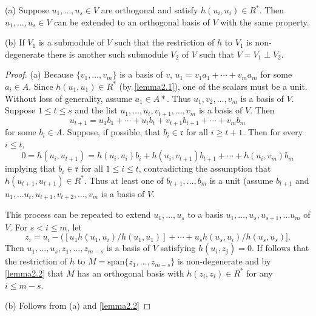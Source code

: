 \begin{lemma}\label{lemma2.3}
\begin{description}
\item{(a)} Suppose $u_1, \dotsc, u_s \in V$ are orthogonal and satisfy $h(u_i, u_i) \in R^*$.
Then $u_1, \dotsc , u_s \in V$ can be extended to an orthogonal basis of $V$ with the same property.
\item{(b)} If $V_1$ is a submodule of $V$ such that the restriction of $h$ to $V_1$ is non-degenerate there is another such submodule $V_2$ of $V$ such that $V = V_1 \perp V_2$.
\end{description}
\end{lemma}
\begin{proof}
(a) Because $\{v_1, \dotsc, v_m \}$ is a basis of $v$, $u_1 = v_1 a_1 + \dotsb + v_m a_m$ for some $a_i \in A$.
Since $h(u_1, u_1) \in R^*$ (by \cref{lemma2.1}), one of the scalars must be a unit. Without loss of generality, assume $a_1 \in A*$.
Thus $u_1, v_2, \dotsc, v_m$ is a basis of $V$.
Suppose $1 \le t \le s$ and the list $u_1, \dotsc, u_t, v_{t+1}, \dotsc, v_m$ is a basis of $V$.
Then 
\[
u_{t+1} = u_1b_1 + \dotsb + u_t b_t + v_{t+1} b_{t+1} + \dotsb + v_m b_m
\]
for some $b_i \in A$.
Suppose, if possible, that $b_i \in \mathfrak{r}$ for all $i \ge t+1$.
Then for every $i \le t$,
\[
0 = h(u_i, u_{t+1}) = h(u_i, u_i) b_i + h(u_i, v_{t+1})b_{t+1} + \dotsb + h(u_i, v_m) b_m
\]
implying that $b_i \in \mathfrak{r}$ for all $1 \le i \le t$, contradicting the assumption that $h(u_{t+1}, u_{t+1}) \in R^*$.
Thus at least one of $b_{t+1}, \dotsc,b_m$ is a unit (assume $b_{t+1}$ and $u_1, \dotsc u_t, u_{t+1}, v_{t+2}, \dotsc, v_m$ is a basis of $V$.

This process can be repeated to extend $u_1, \dotsc, u_s$ to a basis $u_1, \dotsc, u_s, u_{s+1}, \dotsc u_m$ of $V$.
For $s < i \le m$, let
\[
z_i = u_i - ([u_1h(u_1, u_i)/h(u_1, u_1)] + \dotsb + u_s h(u_s, u_i) / h(u_s, u_s)].
\]
Then $u_1, \dotsc, u_s, z_1, \dotsc, z_{m-s}$ is a basis of $V$ satisfying $h(u_i, z_j) = 0$.
If follows that the restriction of $h$ to $M = \text{span} \{z_1, \dotsc, z_{m-s}\}$ is non-degenerate and by \cref{lemma2.2} that $M$ has an orthogonal basis with $h(z_i, z_i) \in R^*$ for any $i \le m - s$.

(b) Follows from (a) and \cref{lemma2.2}
\end{proof}


